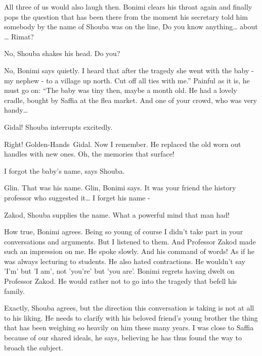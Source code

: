 \documentclass[letterpaper]{article}
\begin{document}
{\textquotedbl}All three of us would also laugh then.{\textquotedbl} Bonimi clears his throat again and finally pops the
question that has been there from the moment his secretary told him somebody by the name of Shouba was on the line,
{\textquotedbl}Do you know anything{\dots} about {\dots} Rimat?{\textquotedbl} 

{\textquotedbl}No,{\textquotedbl} Shouba shakes his head. {\textquotedbl}Do you?{\textquotedbl} 

{\textquotedbl}No,{\textquotedbl} Bonimi says quietly. {\textquotedbl}I heard that after the tragedy she went with the
baby - my nephew - to a village up north. Cut off all ties with me.'' Painful as it is, he must go on: ``The baby was
tiny then, maybe a month old. He had a lovely cradle, bought by Saffia at the flea market. And one of your crowd, who
was very handy{\dots}{\textquotedbl}

{\textquotedbl}Gidal!{\textquotedbl} Shouba interrupts excitedly.

{\textquotedbl}Right! Golden-Hands\ Gidal. Now I remember. He replaced the old worn out handles with new ones. Oh, the
memories that surface!{\textquotedbl}

{\textquotedbl}I forgot the baby's name,{\textquotedbl} says Shouba.

{\textquotedbl}Glin. That was his name. Glin,{\textquotedbl} Bonimi says. {\textquotedbl}It was your friend the history
professor who suggested it{\dots} I forget his name -{\textquotedbl}

{\textquotedbl}Zakod,{\textquotedbl} Shouba supplies the name. {\textquotedbl}What a powerful mind that man
had!{\textquotedbl}

{\textquotedbl}How true,{\textquotedbl} Bonimi agrees. {\textquotedbl}Being so young of course I didn't take part in
your conversations and arguments. But I listened to them. And Professor Zakod made such an impression on me. He spoke
slowly. And his command of words! As if he was always lecturing to students. He also hated contractions. He wouldn't
say 'I'm' but 'I am', not 'you're' but 'you are'.{\textquotedbl} Bonimi regrets having dwelt on Professor Zakod. He
would rather not to go into the tragedy that befell his family.

{\textquotedbl}Exactly,{\textquotedbl} Shouba agrees, but the direction this conversation is taking is not at all to his
liking. He needs to clarify with his beloved friend's young brother the thing that has been weighing so heavily on him
these many years. {\textquotedbl}I was close to Saffia because of our shared ideals,{\textquotedbl} he says, believing
he has thus found the way to broach the subject. 
\end{document}
